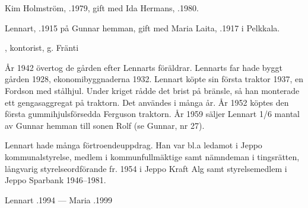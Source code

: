 Kim Holmström, .1979, gift med Ida Hermans, .1980.
\begin{jhchildren}
  \item {}
  \item {}
  \item {}
\end{jhchildren}


%
Lennart, .1915 på Gunnar hemman, gift med Maria Laita, .1917 i Pelkkala.
\begin{jhchildren}
  \item {}
  \item {}
  \item {}
  \item {}, kontorist, g. Fränti
  \item {}
  \item {}
\end{jhchildren}


År 1942 övertog de gården efter Lennarts föräldrar. Lennarts far hade byggt gården 1928, ekonomibyggnaderna 1932. Lennart köpte sin första traktor 1937, en Fordson med stålhjul. Under kriget rådde det brist på bränsle, så han monterade ett gengasaggregat på traktorn. Det användes i många år. År 1952 köptes den första gummihjulsförsedda Ferguson traktorn. År 1959 säljer Lennart 1/6 mantal av Gunnar hemman till sonen Rolf (se Gunnar, nr 27).

Lennart hade många förtroendeuppdrag. Han var bl.a ledamot i Jeppo kommunalstyrelse, medlem i kommunfullmäktige samt nämndeman i tingsrätten, långvarig styrelseordförande fr. 1954 i Jeppo Kraft Alg samt styrelsemedlem i Jeppo Sparbank 1946--1981.

Lennart .1994  ---  Maria .1999


